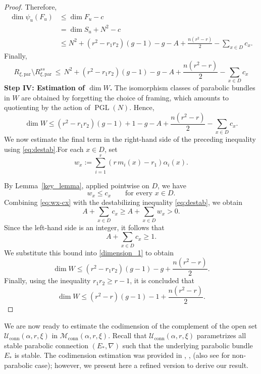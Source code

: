 \documentclass[11pt, reqno]{amsart}
\numberwithin{equation}{section}
\DeclareMathOperator{\PGL}{PGL}
\theoremstyle{definition}
\begin{document}
\begin{proof}
Therefore,
\begin{align*}
\dim \psi_u(F_u)
&\leq \dim F_u - c \\
&= \dim S_u + N^2 - c \\
&\leq N^2+ (r^2-r_1r_2)(g-1)-g-A+\frac{n(r^2-r)}2-\sum_{x\in D}c_x.
\end{align*}
Finally,
\[
 R_{\xi,\mathrm{par}}\setminus R^{ss}_{\xi,\mathrm{par}} \, \leq \, N^2+ (r^2-r_1r_2)(g-1)-g-A+\frac{n(r^2-r)}2-\sum_{x\in D}c_x
\]
\noindent \textbf{Step IV: Estimation of $\dim W$.} 
The isomorphism classes of parabolic bundles in $W$ are obtained by forgetting the choice of framing, which amounts to quotienting by the action of $\PGL(N)$. Hence,
\begin{equation}\label{dimension_1}
\dim W \leq (r^2-r_1r_2)(g-1)+1-g-A+\frac{n(r^2-r)}2-\sum_{x\in D}c_x.
\end{equation}
We now estimate the final term in the right-hand side of the preceding inequality using \eqref{eq:destab}.For each $x \in D$, set
\[
w_x:=\sum_{i=1}^r (r\,m_i(x)-r_1)\alpha_i(x).
\]

By Lemma~\ref{key_lemma}, applied pointwise on $D$, we have
\begin{equation}\label{eq:wx-cx}
w_x\leq c_x
\qquad\text{for every }x\in D.
\end{equation}
Combining \eqref{eq:wx-cx} with the destabilizing inequality \eqref{eq:destab}, we obtain
\[
A+\sum_{x\in D}c_x \ge A+\sum_{x\in D}w_x>0.
\]
Since the left-hand side is an integer, it follows that
\[
A+\sum_{x\in D}c_x\ge 1.
\]
We substitute this bound into \eqref{dimension_1} to obtain
\[
\dim W
\le
(r^2-r_1r_2)(g-1)-g+\frac{n(r^2-r)}{2}.
\]
Finally, using the inequality \(r_1r_2\ge r-1\), it is concluded that
\[
\dim W
\le
(r^2-r)(g-1)-1+\frac{n(r^2-r)}{2}.
\]
\end{proof}


 	We are now ready to estimate the codimension of the complement of the open set $\mathcal{U}_{\mathrm{conn}}(\alpha, r,\xi)$ in $\mathcal{M}_{\mathrm{conn}}(\alpha, r,\xi)$. Recall that $\mathcal{U}_{\mathrm{conn}}(\alpha, r,\xi)$  parametrizes all stable parabolic connection $(E_*, \nabla)$ such that the underlying parabolic bundle $E_*$ is stable. The codimension estimation was provided in \cite{BB23}, \cite[Section $3$]{MY20}, \cite[Section $5$]{S00} (also see \cite{B99, BM07} for non-parabolic case); however, we present here a refined version to derive our result.
\end{document}
